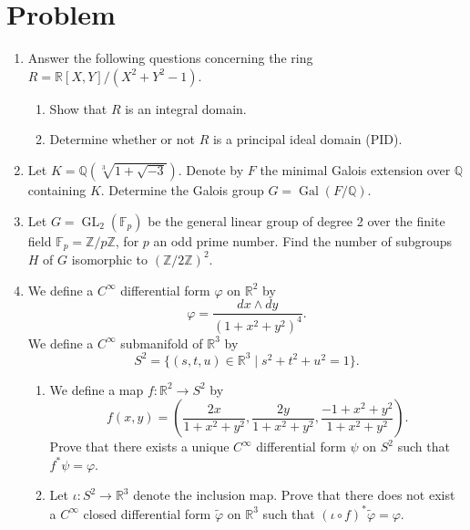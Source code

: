 \documentclass{article}
\begin{document}
\section*{Problem}
\begin{enumerate}[label=\fbox{\arabic*}]
  \item Answer the following questions concerning the ring $R = \mathbb{R}[X, Y]/(X^2 + Y^2 - 1)$.
        \begin{enumerate}[label=(\arabic*)]
          \item Show that $R$ is an integral domain.
          \item Determine whether or not $R$ is a principal ideal domain (PID).
        \end{enumerate}

  \item Let $K = \mathbb{Q}(\sqrt[3]{1 + \sqrt{-3}})$. Denote by $F$ the minimal Galois extension over $\mathbb{Q}$ containing $K$. Determine the Galois group $G = \operatorname{Gal}(F/\mathbb{Q})$.

  \item Let $G = \operatorname{GL}_2(\mathbb{F}_p)$ be the general linear group of degree 2 over the finite field $\mathbb{F}_p = \mathbb{Z}/p\mathbb{Z}$, for $p$ an odd prime number. Find the number of subgroups $H$ of $G$ isomorphic to $(\mathbb{Z}/2\mathbb{Z})^2$.

  \item We define a $C^\infty$ differential form $\varphi$ on $\mathbb{R}^2$ by
        \[
          \varphi = \frac{dx \wedge dy}{(1 + x^2 + y^2)^4}.
        \]
        We define a $C^\infty$ submanifold of $\mathbb{R}^3$ by
        \[
          S^2 = \{ (s, t, u) \in \mathbb{R}^3 \mid s^2 + t^2 + u^2 = 1 \}.
        \]
        \begin{enumerate}[label=(\arabic*)]
          \item We define a map $f: \mathbb{R}^2 \to S^2$ by
                \[
                  f(x, y) = \left( \frac{2x}{1 + x^2 + y^2}, \frac{2y}{1 + x^2 + y^2}, \frac{-1 + x^2 + y^2}{1 + x^2 + y^2} \right).
                \]
                Prove that there exists a unique $C^\infty$ differential form $\psi$ on $S^2$ such that $f^* \psi = \varphi$.
          \item Let $\iota: S^2 \to \mathbb{R}^3$ denote the inclusion map. Prove that there does not exist a $C^\infty$ closed differential form $\tilde{\varphi}$ on $\mathbb{R}^3$ such that $(\iota \circ f)^* \tilde{\varphi} = \varphi$.
        \end{enumerate}


\end{enumerate}
\end{document}
